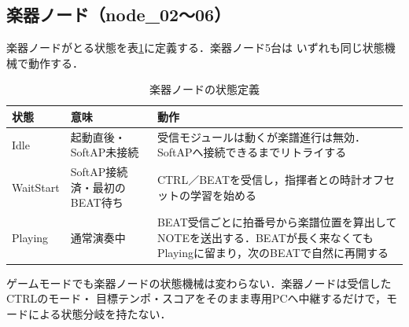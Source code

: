 \documentclass[lualatex,book,paper=a4paper,jafontsize=11.5pt,jafontscale=1.05]{jlreq}
\begin{document}
\subsection{楽器ノード（node\_02〜06）}
楽器ノードがとる状態を表\ref{tab:state-performer}に定義する．楽器ノード5台は
いずれも同じ状態機械で動作する．
\begin{table}[H]\centering
  \caption{楽器ノードの状態定義}\label{tab:state-performer}
  \small
  \begin{tabularx}{\linewidth}{>{\raggedright\arraybackslash}p{2.2cm} >{\raggedright\arraybackslash}p{3.4cm} X}
    \toprule
    状態 & 意味 & 動作 \\
    \midrule
    Idle & 起動直後・SoftAP未接続 & 受信モジュールは動くが楽譜進行は無効．SoftAPへ接続できるまでリトライする \\
    WaitStart & SoftAP接続済・最初のBEAT待ち & CTRL／BEATを受信し，指揮者との時計オフセットの学習を始める \\
    Playing & 通常演奏中 & BEAT受信ごとに拍番号から楽譜位置を算出してNOTEを送出する．BEATが長く来なくてもPlayingに留まり，次のBEATで自然に再開する \\
    \bottomrule
  \end{tabularx}
\end{table}
ゲームモードでも楽器ノードの状態機械は変わらない．楽器ノードは受信したCTRLのモード・
目標テンポ・スコアをそのまま専用PCへ中継するだけで，モードによる状態分岐を持たない．
\end{document}
